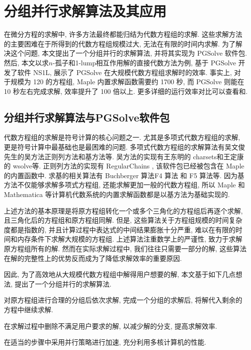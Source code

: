 \chapter{分组并行求解算法及其应用}\label{ch03}
在微分方程的求解中, 许多方法最终都能归结为代数方程组的求解. 这些求解方法的主要困难在于所得到的代数方程组规模过大, 无法在有限的时间内求解. 为了解决这个问题, 本文提出了一个分组并行的求解算法, 并将其实现为 PGSolve 软件包. 然后, 本文以求$n$-孤子和1-lump相互作用解的直接代数方法为例, 基于 PGSolve 开发了软件 NS1L, 展示了 PGSolve 在大规模代数方程组求解时的效率. 事实上, 对于规模为 120 的方程组, Maple 内置求解函数需要约 1700 秒, 而 PGSolve 则能在 10 秒左右完成求解, 效率提升了 100 倍以上. 更多详细的运行效率对比可以查看和. 

\section{分组并行求解算法与PGSolve软件包}
代数方程组的求解是符号计算的核心问题之一. 尤其是多项式代数方程组的求解, 更是符号计算中最基础也是最困难的问题. 多项式代数方程组的求解算法有吴文俊先生的吴方法\cite{wu1984,wu1985}\D 正则列方法\cite{kalkbrener1991three,lu1994searching}和\Grobner{}基方法\cite{adams1994introduction}等. 吴方法的实现有王东明的 charsets\cite{wang1995implementation}和王定康的 wsolve\cite{wsolve}等. 正则列方法的实现有 RegularChains \cite{maza2000triangular}, 该软件包已经被包含在 Maple 的内置函数中. 求\Grobner{}基的相关算法有 Buchberger 算法\cite{buchberger1970algorithmic}\D F4 算法\cite{faugere1999new} 和 F5 算法\cite{faugere2002new}等. 因为\Grobner{}基方法不仅能够求解多项式方程组, 还能求解更加一般的代数方程组, 所以 Maple 和 Mathematica 等计算机代数系统的内置求解函数都是以\Grobner{}基方法为基础实现的.

上述方法的基本原理是将原方程组转化一个或多个三角化的方程组后再逐个求解, 且三角化后的方程组和原方程组同解. 但是, 这些算法关于方程组规模的时间复杂度都是指数的, 并且计算过程中表达式的中间结果膨胀十分严重, 难以在有限的时间和内存条件下求解大规模的方程组. 上述算法注重数学上的严谨性, 致力于求解原方程组所有的解. 然而在实际求解过程中, 我们往往只需要一部分的解, 这些算法在解的完整性上的优势反而成为了降低求解效率的重要原因. 

因此, 为了高效地从大规模代数方程组中解得用户想要的解, 本文基于如下几点想法, 提出了一个分组并行的求解算法.
\begin{compactenum}[(1)]
\item 对原方程组进行合理的分组后依次求解, 完成一个分组的求解后, 将解代入剩余的方程中继续求解. 
\item 在求解过程中删除不满足用户要求的解, 以减少解的分支, 提高求解效率.
\item 在适当的步骤中采用并行策略进行加速, 充分利用多核计算机的性能.
\end{compactenum}

